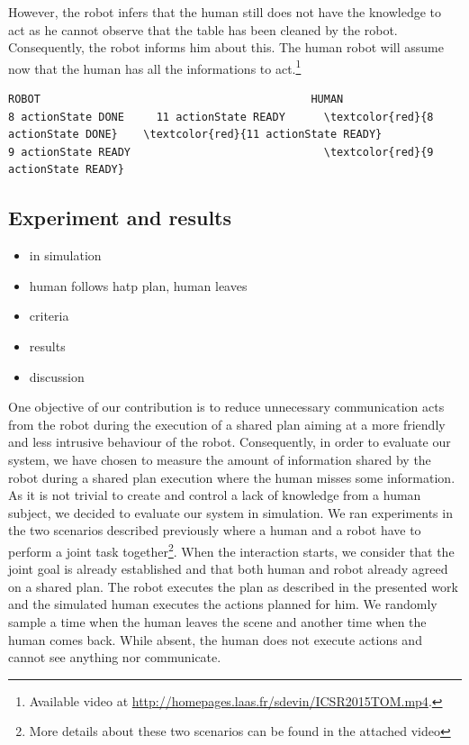 \documentclass[english,a4paper,11pt,twoside]{StyleThese}
\begin{document}
However, the robot infers that the human still does not have the knowledge to act as he cannot observe that the table has been cleaned by the robot. Consequently, the robot informs him about this. The human robot will assume now that the human has all the informations to act.\footnote{Available video at \url{http://homepages.laas.fr/sdevin/ICSR2015TOM.mp4}.
}

\begin{scriptsize}
\begin{Verbatim}[commandchars=\\\{\}]   
                      ROBOT                                          HUMAN                         
8 actionState DONE     11 actionState READY      \textcolor{red}{8 actionState DONE}    \textcolor{red}{11 actionState READY}
9 actionState READY                              \textcolor{red}{9 actionState READY}
\end{Verbatim}
\end{scriptsize}

\subsection{Experiment and results}

\begin{itemize}
\item in simulation
\item human follows hatp plan, human leaves
\item criteria
\item results
\item discussion
\end{itemize}


One objective of our contribution is to reduce unnecessary communication acts from the robot during the execution of a shared plan aiming at a more friendly and less intrusive behaviour of the robot. Consequently, in order to evaluate our system, we have chosen to measure the amount of information shared by the robot during a shared plan execution where the human misses some information. As it is not trivial to create and control a lack of knowledge from a human subject, we decided to evaluate our system in simulation. We ran experiments in the two scenarios described previously where a human and a robot have to perform a joint task together\footnote{More details about these two scenarios can be found in the attached video}. When the interaction starts, we consider that the joint goal is already established and that both human and robot already agreed on a shared plan. The robot executes the plan as described in the presented work and the simulated human executes the actions planned for him. We randomly sample a time when the human leaves the scene and another time when the human comes back. While absent, the human does not execute actions and cannot see anything nor communicate.
\end{document}

